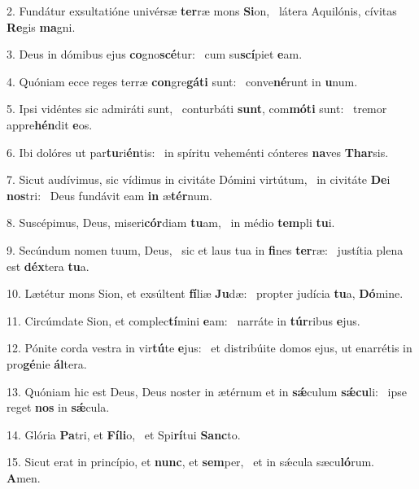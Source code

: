 2. Fundátur exsultatióne univérsæ \textbf{ter}ræ mons \textbf{Si}on, \ast\  látera Aquilónis, cívitas \textbf{Re}gis \textbf{ma}gni.\

3. Deus in dómibus ejus \textbf{co}gno\textbf{scé}tur: \ast\  cum su\textbf{scí}piet \textbf{e}am.\

4. Quóniam ecce reges terræ \textbf{con}gre\textbf{gá}\textbf{ti} sunt: \ast\  conve\textbf{né}runt in \textbf{u}num.\

5. Ipsi vidéntes sic admiráti sunt, \dag\  conturbáti \textbf{sunt}, com\textbf{mó}\textbf{ti} sunt: \ast\  tremor appre\textbf{hén}dit \textbf{e}os.\

6. Ibi dolóres ut par\textbf{tu}ri\textbf{én}tis: \ast\  in spíritu veheménti cónteres \textbf{na}ves \textbf{Thar}sis.\

7. Sicut audívimus, sic vídimus in civitáte Dómini virtútum, \dag\  in civitáte \textbf{De}i \textbf{nos}tri: \ast\  Deus fundávit eam \textbf{in} æ\textbf{tér}num.\

8. Suscépimus, Deus, miseri\textbf{cór}diam \textbf{tu}am, \ast\  in médio \textbf{tem}pli \textbf{tu}i.\

9. Secúndum nomen tuum, Deus, \dag\  sic et laus tua in \textbf{fi}nes \textbf{ter}ræ: \ast\  justítia plena est \textbf{déx}tera \textbf{tu}a.\

10. Lætétur mons Sion, et exsúltent \textbf{fí}liæ \textbf{Ju}dæ: \ast\  propter judícia \textbf{tu}a, \textbf{Dó}mine.\

11. Circúmdate Sion, et complec\textbf{tí}mini \textbf{e}am: \ast\  narráte in \textbf{túr}ribus \textbf{e}jus.\

12. Pónite corda vestra in vir\textbf{tú}te \textbf{e}jus: \ast\  et distribúite domos ejus, ut enarrétis in pro\textbf{gé}nie \textbf{ál}tera.\

13. Quóniam hic est Deus, Deus noster in ætérnum et in \textbf{sǽ}culum \textbf{sǽ}\textbf{cu}li: \ast\  ipse reget \textbf{nos} in \textbf{sǽ}cula.\

14. Glória \textbf{Pa}tri, et \textbf{Fí}\textbf{li}o, \ast\  et Spi\textbf{rí}tui \textbf{Sanc}to.\

15. Sicut erat in princípio, et \textbf{nunc}, et \textbf{sem}per, \ast\  et in sǽcula sæcu\textbf{ló}rum. \textbf{A}men.\

